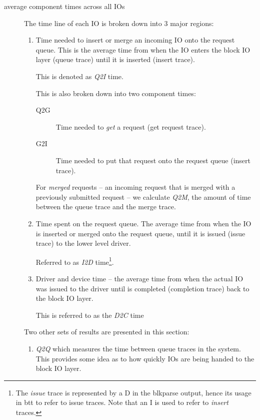 \documentclass{article}
\begin{document}
\begin{description}
  \item[average component times across all IOs] The time line of each IO
  is broken down into 3 major regions:

    \begin{enumerate}
      \item Time needed to insert or merge an incoming IO onto the request
      queue. This is the average time from when the IO enters the block
      IO layer (queue trace) until it is inserted (insert trace).

      This is denoted as \emph{Q2I} time.

      This is also broken down into two component times:

        \begin{description}
	  \item[Q2G] Time needed to \emph{get} a request (get request
	  trace).

	  \item[G2I] Time needed to put that request onto the request
	  queue (insert trace).
        \end{description}

      For \emph{merged} requests -- an incoming request that is merged
      with a previously submitted request -- we calculate \emph{Q2M}, the
      amount of time between the queue trace and the merge trace.

      \item Time spent on the request queue. The average time from when
      the IO is inserted or merged onto the request queue, until it is
      issued (issue trace) to the lower level driver.

      Referred to as \emph{I2D} time\footnote{The \emph{issue} trace
      is represented by a D in the blkparse output, hence its usage in
      btt to refer to issue traces. Note that an I is used to refer to
      \emph{insert} traces.}.

      \item Driver and device time -- the average time from when the
      actual IO was issued to the driver until is completed (completion
      trace) back to the block IO layer.

      This is referred to as the \emph{D2C} time\
    \end{enumerate}

  Two other sets of results are presented in this section:

    \begin{enumerate}
      \item \emph{Q2Q} which measures the time between queue traces
      in the system. This provides some idea as to how quickly IOs are
      being handed to the block IO layer.


\end{enumerate}
\end{description}
\end{document}
